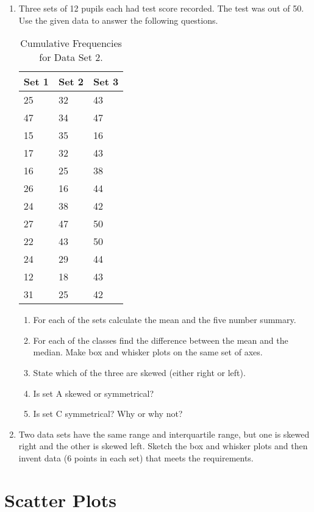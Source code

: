 {
\begin{enumerate}
\item Three sets of 12 pupils each had test score recorded. The test was out of 50. Use the given data to answer the following questions.
\begin{table}[htb]
\begin{center}
\begin{tabular}{|l|l|l|}
\hline
Set 1 & Set 2 & Set 3 \\ 
\hline
25 & 32 & 43 \\
47 & 34 & 47 \\
15 & 35 & 16 \\
17 & 32 & 43 \\
16 & 25 & 38 \\
26 & 16 & 44 \\
24 & 38 & 42 \\
27 & 47 & 50 \\
22 & 43 & 50 \\
24 & 29 & 44 \\
12 & 18 & 43 \\
31 & 25 & 42 \\
\hline
\end{tabular}
\caption{Cumulative Frequencies for Data Set 2. \label{tab:mdat:s:cumulativeds2}}
\end{center}
\end{table}
\begin{enumerate}
\item For each of the sets calculate the mean and the five number summary.
\item For each of the classes find the difference between the mean and the median. Make box and whisker plots on the same set of axes.
\item State which of the three are skewed (either right or left).
\item Is set A skewed or symmetrical? 
\item Is set C symmetrical? Why or why not?
\end{enumerate}
\item Two data sets have the same range and interquartile range, but one is skewed right and the other is skewed left. Sketch the box and whisker plots and then invent data (6 points in each set) that meets the requirements.
\end{enumerate}
}

\section{Scatter Plots}
\label{ms:sp}

